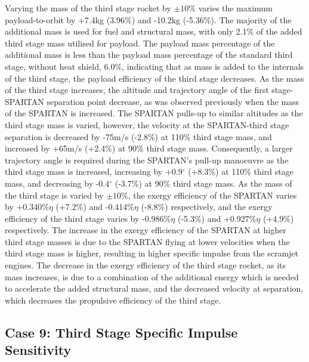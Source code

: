 Varying the mass of the third stage rocket by $\pm10\%$ varies the maximum payload-to-orbit by +7.4kg (3.96\%) and -10.2kg (-5.36\%). 
The majority of the additional mass is used for fuel and structural mass, with only 2.1\% of the added third stage mass utilised for payload. The payload mass percentage of the additional mass is less than the payload mass percentage of the standard third stage, without heat shield, 6.0\%, indicating that as mass is added to the internals of the third stage, the payload efficiency of the third stage decreases.
 As the mass of the third stage increases, the altitude and trajectory angle of the first stage-SPARTAN separation point decrease, as was observed previously when the mass of the SPARTAN is increased. 
 The SPARTAN pulls-up to similar altitudes as the third stage mass is varied, however, the velocity at the SPARTAN-third stage separation is decreased by -75m/s (-2.8\%) at 110\% third stage mass, and increased by +65m/s (+2.4\%) at 90\% third stage mass. 
 Consequently, a larger trajectory angle is required during the SPARTAN's pull-up manoeuvre as the third stage mass is increased, increasing by +0.9$^\circ$ (+8.3\%) at 110\% third stage mass, and decreasing by -0.4$^\circ$ (-3.7\%) at 90\% third stage mass. 
As the mass of the third stage is varied by $\pm10\%$, the exergy efficiency of the SPARTAN varies by +0.340\%$\eta$ (+7.2\%) and -0.414\%$\eta$ (-8.8\%) respectively, and the exergy efficiency of the third stage varies by -0.986\%$\eta$ (-5.3\%) and +0.927\%$\eta$ (+4.9\%) respectively. The increase in the exergy efficiency of the SPARTAN at higher third stage masses is due to the SPARTAN flying at lower velocities when the third stage mass is higher, resulting in higher specific impulse from the scramjet engines. 
The decrease in the exergy efficiency of the third stage rocket, as its mass increases, is due to a combination of the additional energy which is needed to accelerate the added structural mass, and the decreased velocity at separation, which decreases the propulsive efficiency of the third stage. 



\subsection{Case 9: Third Stage Specific Impulse Sensitivity}\label{sec:isp3NoReturn}

